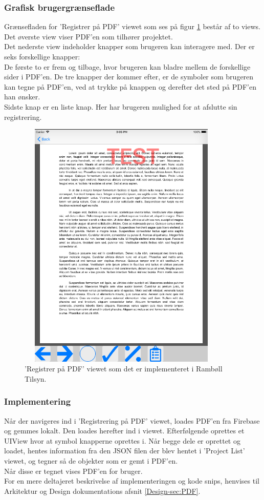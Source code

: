 \subsubsection{Grafisk brugergrænseflade}
Grænsefladen for 'Registrer på PDF' viewet som ses på figur \ref{fig:RegistrerObjekterView} består af to views. 
Det øverste view viser PDF'en som tilhører projektet. \\
Det nederste view indeholder knapper som brugeren kan interagere med. Der er seks forskellige knapper: \\
De første to er frem og tilbage, hvor brugeren kan bladre mellem de forskellige sider i PDF'en. De tre knapper der kommer efter, er de symboler som brugeren kan tegne på PDF'en, ved at trykke på knappen og derefter det sted på PDF'en han ønsker. \\
Sidste knap er en liste knap. Her har brugeren mulighed for at afslutte sin registrering.
\begin{figure}[H] %
	\centering
	\includegraphics[height=12cm, width=10cm]{Design/Applikation/RegistrePDF/PDF}
	\caption{'Registrer på PDF' viewet som det er implementeret i Rambøll Tilsyn.}
	\label{fig:RegistrerObjekterView}
\end{figure}

\subsubsection{Implementering}
Når der navigeres ind i 'Registrering på PDF' viewet, loades PDF'en fra Firebase og gemmes lokalt. Den loades herefter ind i viewet. Efterfølgende oprettes et UIView hvor at symbol knapperne oprettes i. Når begge dele er oprettet og loadet, hentes information fra den JSON filen der blev hentet i 'Project List' viewet, og tegner så de objekter som er gemt i PDF'en. \\
Når disse er tegnet vises PDF'en for bruger. \\
For en mere deltajeret beskrivelse af implementeringen og kode snips, henvises til Arkitektur og Design dokumentations afsnit \ref{Design-sec:PDF}.


\clearpage